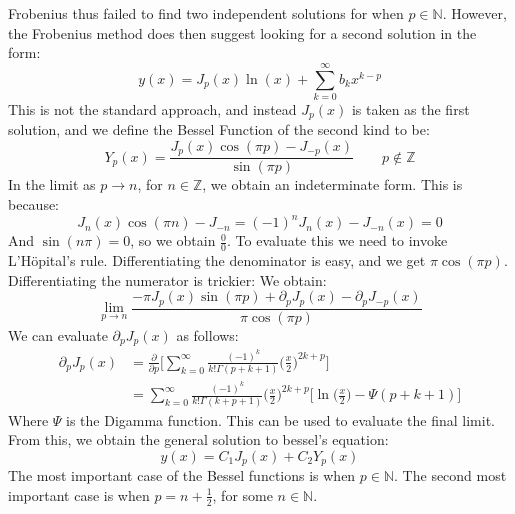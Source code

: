         Frobenius thus failed to find two independent solutions for
        when $p\in\mathbb{N}$. However, the Frobenius method does
        then suggest looking for a second solution in the form:
        \begin{equation}
            y(x)=J_{p}(x)\ln(x)+\sum_{k=0}^{\infty}b_{k}x^{k-p}
        \end{equation}
        This is not the standard approach, and instead $J_{p}(x)$
        is taken as the first solution, and we define the
        Bessel Function of the second kind to be:
        \begin{equation}
            Y_{p}(x)=
            \frac{J_{p}(x)\cos(\pi{p})-J_{\minus{p}}(x)}
                {\sin(\pi{p})}
            \quad\quad
            p\notin\mathbb{Z}
        \end{equation}
        In the limit as $p\rightarrow{n}$, for $n\in\mathbb{Z}$,
        we obtain an indeterminate form. This is because:
        \begin{equation}
            J_{n}(x)\cos(\pi{n})-J_{\minus{n}}=
            (\minus{1})^{n}J_{n}(x)-J_{\minus{n}}(x)=0
        \end{equation}
        And $\sin(n\pi)=0$, so we obtain $\tfrac{0}{0}$. To
        evaluate this we need to invoke L'H\"{o}pital's rule.
        Differentiating the denominator is easy, and we get
        $\pi\cos(\pi{p})$. Differentiating the numerator is trickier:
        We obtain:
        \begin{equation}
            \underset{p\rightarrow{n}}{\lim}
            \frac{-\pi{J}_{p}(x)\sin(\pi{p})+\partial_{p}J_{p}(x)-
                  \partial_{p}J_{\minus{p}}(x)}{\pi\cos(\pi{p})}
        \end{equation}
        We can evaluate $\partial_{p}J_{p}(x)$ as follows:
        \begin{subequations}
            \begin{align}
                \partial_{p}J_{p}(x)&=
                \frac{\partial}{\partial{p}}
                \Big[\sum_{k=0}^{\infty}
                    \frac{(\minus{1})^{k}}{k!\Gamma(p+k+1)}
                    \Big(\frac{x}{2}\Big)^{2k+p}\Big]\\
                &=\sum_{k=0}^{\infty}
                    \frac{(\minus{1})^{k}}{k!\Gamma(k+p+1)}
                    \Big(\frac{x}{2}\Big)^{2k+p}
                    \Big[\ln\big(\frac{x}{2}\big)-\Psi(p+k+1)\Big]
            \end{align}
        \end{subequations}
        Where $\Psi$ is the Digamma function. This can be used
        to evaluate the final limit. From this, we obtain the
        general solution to bessel's equation:
        \begin{equation}
            y(x)=C_{1}J_{p}(x)+C_{2}Y_{p}(x)
        \end{equation}
        The most important case of the Bessel functions is when
        $p\in\mathbb{N}$. The second most important case is when
        $p=n+\frac{1}{2}$, for some $n\in\mathbb{N}$.
